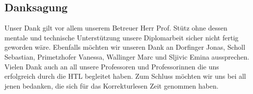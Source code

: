 \begin{spacing}{1}
    \chapter*{Danksagung}
\end{spacing}
Unser Dank gilt vor allem unserem Betreuer Herr Prof. Stütz ohne dessen mentale und technische Unterstützung unsere Diplomarbeit sicher nicht fertig geworden wäre.
\newline
Ebenfalls möchten wir unseren Dank an Dorfinger Jonas, Scholl Sebastian, Primetzhofer Vanessa, Wallinger Marc und Sljivic Emina aussprechen.
\newline
Vielen Dank auch an all unsere Professoren und Professorinnen die uns erfolgreich durch die HTL begleitet haben.
\newline
Zum Schluss möchten wir uns bei all jenen bedanken, die sich für das Korrekturlesen Zeit genommen haben.